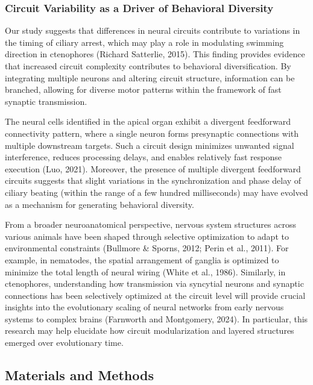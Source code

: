 \documentclass[
  11pt,
]{article}
\begin{document}
\subsubsection{Circuit Variability as a Driver of Behavioral
Diversity}\label{circuit-variability-as-a-driver-of-behavioral-diversity}

Our study suggests that differences in neural circuits contribute to
variations in the timing of ciliary arrest, which may play a role in
modulating swimming direction in ctenophores (Richard Satterlie, 2015).
This finding provides evidence that increased circuit complexity
contributes to behavioral diversification. By integrating multiple
neurons and altering circuit structure, information can be branched,
allowing for diverse motor patterns within the framework of fast
synaptic transmission.

The neural cells identified in the apical organ exhibit a divergent
feedforward connectivity pattern, where a single neuron forms
presynaptic connections with multiple downstream targets. Such a circuit
design minimizes unwanted signal interference, reduces processing
delays, and enables relatively fast response execution (Luo, 2021).
Moreover, the presence of multiple divergent feedforward circuits
suggests that slight variations in the synchronization and phase delay
of ciliary beating (within the range of a few hundred milliseconds) may
have evolved as a mechanism for generating behavioral diversity.

From a broader neuroanatomical perspective, nervous system structures
across various animals have been shaped through selective optimization
to adapt to environmental constraints (Bullmore \& Sporns, 2012; Perin
et al., 2011). For example, in nematodes, the spatial arrangement of
ganglia is optimized to minimize the total length of neural wiring
(White et al., 1986). Similarly, in ctenophores, understanding how
transmission via syncytial neurons and synaptic connections has been
selectively optimized at the circuit level will provide crucial insights
into the evolutionary scaling of neural networks from early nervous
systems to complex brains (Farnworth and Montgomery, 2024). In
particular, this research may help elucidate how circuit modularization
and layered structures emerged over evolutionary time.

\subsection{Materials and Methods}\label{materials-and-methods}
\end{document}
